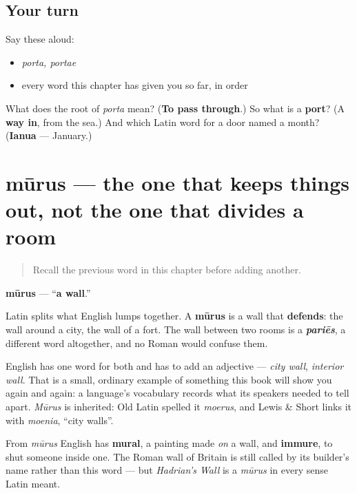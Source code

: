 \subsection*{Your turn}
Say these aloud:

\begin{itemize}
\raggedright
  \item \emph{porta, portae}
  \item every word this chapter has given you so far, in order
\end{itemize}

\begin{tcolorbox}[breakable,colback=teal!4,colframe=teal!35!black,title={Before you move on}]
What does the root of \emph{porta} mean? (\textbf{To pass through}.) So what is a \textbf{port}? (A \textbf{way in}, from the sea.) And which Latin word for a door named a month? (\textbf{Ianua} — January.)
\end{tcolorbox}
\section[mūrus, mūrī]{mūrus — the one that keeps things out, not the one that divides a room}

\label{lesson:LA-C44-murus}



\begin{quote}
Recall the previous word in this chapter before adding another.
\end{quote}

\begin{cousinweb}
\textbf{mūrus} — \textquotedblleft{}\textbf{a wall}.\textquotedblright{}

Latin splits what English lumps together. A \textbf{mūrus} is a wall that \textbf{defends}: the wall around a city, the wall of a fort. The wall between two rooms is a \emph{\textbf{pariēs}}, a different word altogether, and no Roman would confuse them.

English has one word for both and has to add an adjective — \emph{city wall}, \emph{interior wall}. That is a small, ordinary example of something this book will show you again and again: a language's vocabulary records what its speakers needed to tell apart. \emph{Mūrus} is inherited: Old Latin spelled it \emph{moerus}, and Lewis \& Short links it with \emph{moenia}, \textquotedblleft{}city walls\textquotedblright{}.

From \emph{mūrus} English has \textbf{mural}, a painting made \emph{on} a wall, and \textbf{immure}, to shut someone inside one. The Roman wall of Britain is still called by its builder's name rather than this word — but \emph{Hadrian's Wall} is a \emph{mūrus} in every sense Latin meant.
\end{cousinweb}

